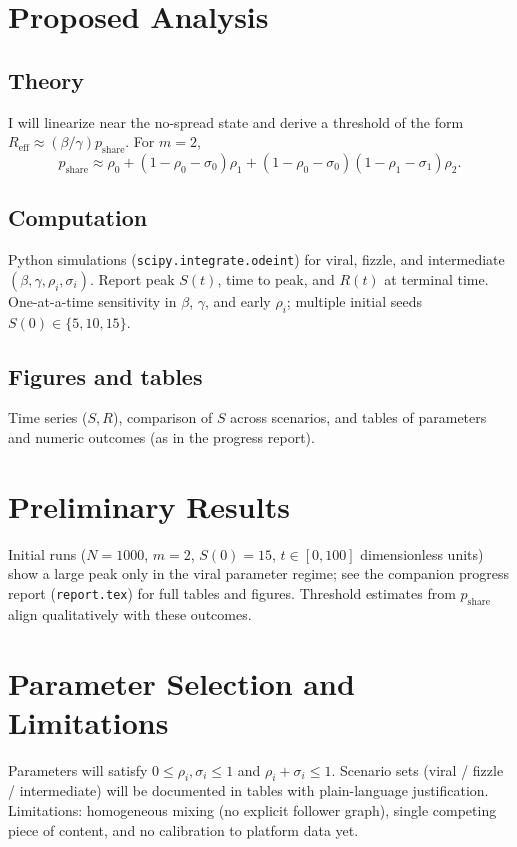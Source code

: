 \documentclass[11pt]{article}
\begin{document}
\section{Proposed Analysis}

\subsection{Theory}

I will linearize near the no-spread state and derive a threshold of the form $R_{\mathrm{eff}}\approx (\beta/\gamma)p_{\mathrm{share}}$. For $m=2$,
\[
p_{\mathrm{share}}\approx \rho_0+(1-\rho_0-\sigma_0)\rho_1+(1-\rho_0-\sigma_0)(1-\rho_1-\sigma_1)\rho_2.
\]

\subsection{Computation}

Python simulations (\texttt{scipy.integrate.odeint}) for viral, fizzle, and intermediate $(\beta,\gamma,\rho_i,\sigma_i)$. Report peak $S(t)$, time to peak, and $R(t)$ at terminal time. One-at-a-time sensitivity in $\beta$, $\gamma$, and early $\rho_i$; multiple initial seeds $S(0)\in\{5,10,15\}$.

\subsection{Figures and tables}

Time series ($S,R$), comparison of $S$ across scenarios, and tables of parameters and numeric outcomes (as in the progress report).

\section{Preliminary Results}

Initial runs ($N=1000$, $m=2$, $S(0)=15$, $t\in[0,100]$ dimensionless units) show a large peak only in the viral parameter regime; see the companion progress report (\texttt{report.tex}) for full tables and figures. Threshold estimates from $p_{\mathrm{share}}$ align qualitatively with these outcomes.

\section{Parameter Selection and Limitations}

Parameters will satisfy $0\le\rho_i,\sigma_i\le 1$ and $\rho_i+\sigma_i\le 1$. Scenario sets (viral / fizzle / intermediate) will be documented in tables with plain-language justification. Limitations: homogeneous mixing (no explicit follower graph), single competing piece of content, and no calibration to platform data yet.
\end{document}
